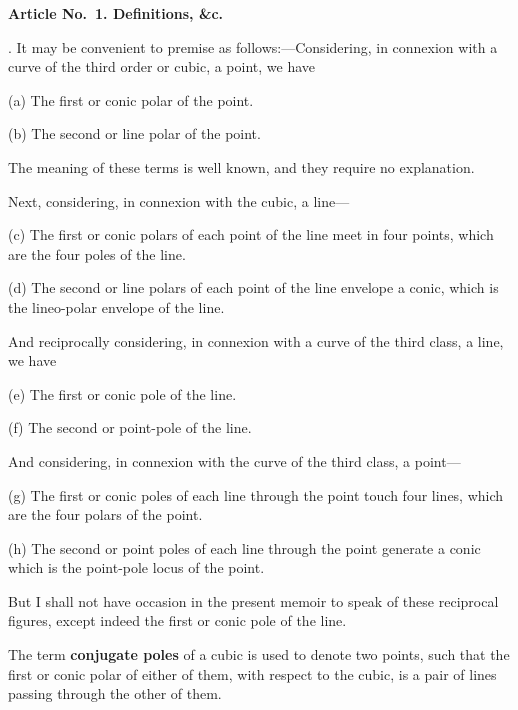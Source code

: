 \documentclass[12pt,a4paper]{article}
\theoremstyle{definition}
\begin{document}
\medskip\noindent\textbf{Article No.~1. Definitions, \&c.}

. It may be convenient to premise as follows:---Considering,
in connexion with a curve of the third order or cubic, a point,
we have

\smallskip
\hspace*{2em}(a) The first or conic polar of the point.

\hspace*{2em}(b) The second or line polar of the point.

\smallskip
The meaning of these terms is well known, and they require
no explanation.

Next, considering, in connexion with the cubic, a line---

\smallskip
\hspace*{2em}(c) The first or conic polars of each point of the line meet
in four points, which are the four poles of the line.

\hspace*{2em}(d) The second or line polars of each point of the line
envelope a conic, which is the lineo-polar envelope of the line.

\smallskip
And reciprocally considering, in connexion with a curve of
the third class, a line, we have

\smallskip
\hspace*{2em}(e) The first or conic pole of the line.

\hspace*{2em}(f) The second or point-pole of the line.

\smallskip
And considering, in connexion with the curve of the third
class, a point---

\smallskip
\hspace*{2em}(g) The first or conic poles of each line through the point
touch four lines, which are the four polars of the point.

\hspace*{2em}(h) The second or point poles of each line through the point
generate a conic which is the point-pole locus of the point.

\smallskip
But I shall not have occasion in the present memoir to speak
of these reciprocal figures, except indeed the first or conic pole
of the line.

The term \textbf{conjugate poles} of a cubic is used to denote two
points, such that the first or conic polar of either of them,
with respect to the cubic, is a pair of lines passing through
the other of them.
\end{document}
